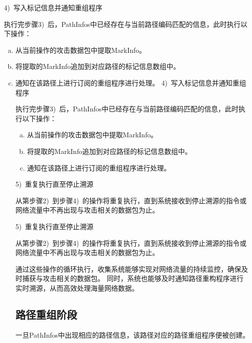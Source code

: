 \begin{enumerate}[a.]
4)~写入标记信息并通知重组程序\par
执行完步骤3)~后，PathInfos中已经存在与当前路径编码匹配的信息，此时执行以下操作：
\begin{enumerate}[a.]
	\item 从当前操作的攻击数据包中提取MarkInfo。
	\item 将提取的MarkInfo追加到对应路径的标记信息数组中。
	\item 通知在该路径上进行订阅的重组程序进行处理。
4)~写入标记信息并通知重组程序\par
执行完步骤3)~后，PathInfos中已经存在与当前路径编码匹配的信息，此时执行以下操作：
\begin{enumerate}[a.]
	\item 从当前操作的攻击数据包中提取MarkInfo。
	\item 将提取的MarkInfo追加到对应路径的标记信息数组中。
	\item 通知在该路径上进行订阅的重组程序进行处理。
\end{enumerate}
\par
5)~重复执行直至停止溯源\par
从第步骤2)~到步骤4)~的操作将重复执行，直到系统接收到停止溯源的指令或网络流量中不再出现与攻击相关的数据包为止。\par
5)~重复执行直至停止溯源\par
从第步骤2)~到步骤4)~的操作将重复执行，直到系统接收到停止溯源的指令或网络流量中不再出现与攻击相关的数据包为止。\par

通过这些操作的循环执行，收集系统能够实现对网络流量的持续监控，确保及时捕获与攻击相关的数据包。
同时，系统也能够及时通知路径重构程序进行实时溯源，从而高效处理海量网络数据。

\subsection{路径重组阶段}
一旦PathInfos中出现相应的路径信息，该路径对应的路径重组程序便被创建。


\end{enumerate}
\end{enumerate}
